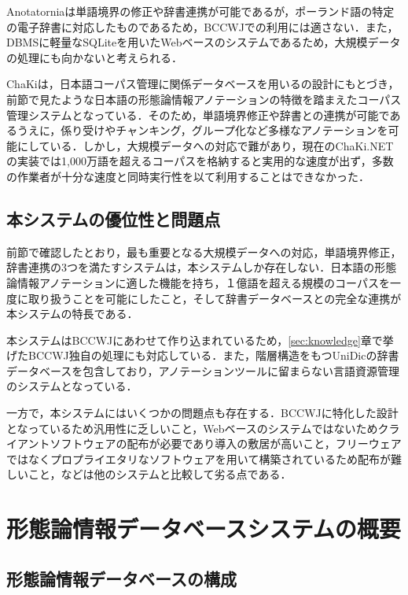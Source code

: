 \documentclass[japanese]{jnlp_1.4}
\begin{document}
Anotatorniaは単語境界の修正や辞書連携が可能であるが，ポーランド語の特定の電子辞書に対応したものであるため，BCCWJでの利用には適さない．また，DBMSに軽量なSQLiteを用いたWebベースのシステムであるため，大規模データの処理にも向かないと考えられる．

ChaKiは，日本語コーパス管理に関係データベースを用いるの設計にもとづき，前節で見たような日本語の形態論情報アノテーションの特徴を踏まえたコーパス管理システムとなっている．そのため，単語境界修正や辞書との連携が可能であるうえに，係り受けやチャンキング，グループ化など多様なアノテーションを可能にしている．しかし，大規模データへの対応で難があり，現在のChaKi.NETの実装では1,000万語を超えるコーパスを格納すると実用的な速度が出ず，多数の作業者が十分な速度と同時実行性を以て利用することはできなかった．


\subsection{本システムの優位性と問題点}

前節で確認したとおり，最も重要となる大規模データへの対応，単語境界修正，辞書連携の3つを満たすシステムは，本システムしか存在しない．日本語の形態論情報アノテーションに適した機能を持ち，１億語を超える規模のコーパスを一度に取り扱うことを可能にしたこと，そして辞書データベースとの完全な連携が本システムの特長である．

本システムはBCCWJにあわせて作り込まれているため，\ref{sec:knowledge}章で挙げたBCCWJ独自の処理にも対応している．また，階層構造をもつUniDicの辞書データベースを包含しており，アノテーションツールに留まらない言語資源管理のシステムとなっている．

一方で，本システムにはいくつかの問題点も存在する．BCCWJに特化した設計となっているため汎用性に乏しいこと，Webベースのシステムではないためクライアントソフトウェアの配布が必要であり導入の敷居が高いこと，フリーウェアではなくプロプライエタリなソフトウェアを用いて構築されているため配布が難しいこと，などは他のシステムと比較して劣る点である．


\section{形態論情報データベースシステムの概要}
\label{sec:bdsystem}

\subsection{形態論情報データベースの構成}
\end{document}
